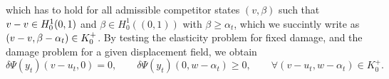 % 
which has to hold for all admissible competitor states $(v, \beta)$ such that $v-v \in H^1_0(0, 1)$ and $\beta\in H^1_0((0,1))$ with $\beta \geq \alpha_t$, which we succintly write as $(v-v, \beta - \alpha_t) \in K^+_{0}$. 
By testing the elasticity problem for fixed damage, and the damage problem for a given displacement field, we obtain 
\begin{equation}
    \label{eq:variational_equilibrium} 
    \delta \Psi(y_t)(v-u_t, 0) = 0, \qquad \delta \Psi(y_t)(0, w-\alpha_t) \geq 0, \qquad \forall (v-u_t, w-\alpha_t) \in K^+_{0}.
\end{equation}

